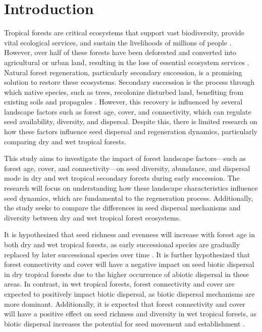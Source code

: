 \documentclass[11pt]{article}
\begin{document}
\section*{Introduction}

Tropical forests are critical ecosystems that support vast biodiversity, provide vital ecological services, and sustain the livelihoods of millions of people \citep{bormaCarbonContributionsSouth2022, mulatuBiodiversityMonitoringChanging2017}. However, over half of these forests have been deforested and converted into agricultural or urban land, resulting in the loss of essential ecosystem services \citep{chazdonNaturalRegenerationTool2016}. Natural forest regeneration, particularly secondary succession, is a promising solution to restore these ecosystems. Secondary succession is the process through which native species, such as trees, recolonize disturbed land, benefiting from existing soils and propagules \citep{poorterSuccessionalTheories2023}. However, this recovery is influenced by several landscape factors such as forest age, cover, and connectivity, which can regulate seed availability, diversity, and dispersal. Despite this, there is limited research on how these factors influence seed dispersal and regeneration dynamics, particularly comparing dry and wet tropical forests.

This study aims to investigate the impact of forest landscape factors—such as forest age, cover, and connectivity—on seed diversity, abundance, and dispersal mode in dry and wet tropical secondary forests during early succession. The research will focus on understanding how these landscape characteristics influence seed dynamics, which are fundamental to the regeneration process. Additionally, the study seeks to compare the differences in seed dispersal mechanisms and diversity between dry and wet tropical forest ecosystems.

It is hypothesized that seed richness and evenness will increase with forest age in both dry and wet tropical forests, as early successional species are gradually replaced by later successional species over time \citep{chazdonNaturalRegenerationTool2016}. It is further hypothesized that forest connectivity and cover will have a negative impact on seed biotic dispersal in dry tropical forests due to the higher occurrence of abiotic dispersal in these areas. In contrast, in wet tropical forests, forest connectivity and cover are expected to positively impact biotic dispersal, as biotic dispersal mechanisms are more dominant. Additionally, it is expected that forest connectivity and cover will have a positive effect on seed richness and diversity in wet tropical forests, as biotic dispersal increases the potential for seed movement and establishment \citep{dentUnitingNicheDifferentiation2021}.
\end{document}
